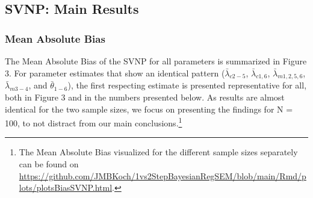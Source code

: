 \documentclass[
  man, donotrepeattitle,floatsintext]{apa6}
\begin{document}
\hypertarget{svnp-main-results}{%
\subsection{SVNP: Main Results}\label{svnp-main-results}}

\hypertarget{mean-absolute-bias-1}{%
\subsubsection{Mean Absolute Bias}\label{mean-absolute-bias-1}}

The Mean Absolute Bias of the SVNP for all parameters is summarized in Figure 3. For parameter estimates that show an identical pattern (\(\bar{\lambda}_{c 2-5}\), \(\bar{\lambda}_{c 1, 6}\), \(\bar{\lambda}_{m 1, 2, 5, 6}\), \(\bar{\lambda}_{m 3-4}\), and \(\bar{\theta}_{1-6}\)), the first respecting estimate is presented representative for all, both in Figure 3 and in the numbers presented below. As results are almost identical for the two sample sizes, we focus on presenting the findings for N = 100, to not distract from our main conclusions.\footnote{The Mean Absolute Bias visualized for the different sample sizes separately can be found on \url{https://github.com/JMBKoch/1vs2StepBayesianRegSEM/blob/main/Rmd/plots/plotsBiasSVNP.html}.}
\end{document}
